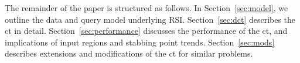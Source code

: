 
The remainder of the paper is structured as follows. In
Section~\ref{sec:model}, we outline the data and query model
underlying \ac{RSI}.  Section~\ref{sec:dct} describes the \ac{ct} in
detail.  Section~\ref{sec:performance} discusses the performance of
the \ac{ct}, and implications of input regions and stabbing point
trends.  Section~\ref{sec:mods} describes extensions and modifications
of the \ac{ct} for similar problems.

